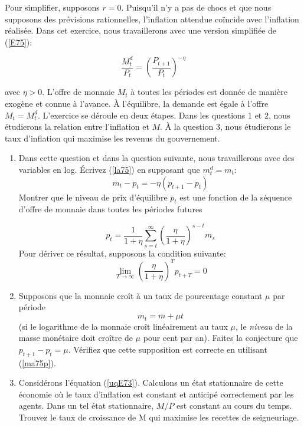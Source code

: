 \documentclass[a4paper,11pt]{article}
\begin{document}
Pour simplifier, supposons $ r=0 $. Puisqu'il n'y a pas de chocs et que nous supposons des prévisions rationnelles, l'inflation attendue coïncide avec l'inflation réalisée. Dans cet exercice, nous travaillerons avec une version simplifiée de (\ref{E75}):

\begin{equation}
\frac{M^d_{t}}{P_{t}}=(\frac{P_{t+1}}{P_{t}})^{-\eta}  \label{la75}
\end{equation}

avec $ \eta> 0 $. L'offre de monnaie $ M_t $ à toutes les périodes est donnée de manière exogène et connue à l'avance. \`{A} l'équilibre, la demande est égale à l'offre $ M_t = M^d_t $. L'exercice se déroule en deux étapes. Dans les questions 1 et 2, nous étudierons la relation entre l'inflation et $M$. À la question 3, nous étudierons le taux d'inflation qui maximise les revenus du gouvernement.


\begin{enumerate}
\item Dans cette question et dans la question suivante, nous travaillerons avec des variables en log. Écrivez (\ref{la75}) en supposant que $m^d_t=m_t$:  
\begin{equation}
m_t-p_t=-\eta(p_{t+1}-p_t)  \label{ma75p}
\end{equation}  Montrer que le niveau de prix d'équilibre $ p_t $ est une fonction de la séquence d'offre de monnaie  dans toutes les périodes futures

\begin{equation}
p_t=\frac{1}{1+\eta}\sum^{\infty}_{s=t}(\frac{\eta}{1+\eta})^{s-t} m_s\label{aa}
\end{equation}
Pour dériver ce résultat, supposons la condition suivante:
 \begin{equation}\label{bubble}\lim_{T\to \infty} (\frac{\eta}{1+\eta})^Tp_{t+T}=0
\end{equation}

\item Supposons que la monnaie croît à un taux de pourcentage constant $ \mu $ par période
\begin{equation}
m_t=\bar{m}+\mu t
\end{equation} 
(si le logarithme de la monnaie croît linéairement au taux $ \mu $, le \textit {niveau} de la masse monétaire doit croître de $\mu $ pour cent par an). Faites la conjecture que $ p_ {t + 1} -p_t = \mu $. Vérifiez que cette supposition est correcte en utilisant (\ref{ma75p}).
\bigskip 

\item Considérons l'équation (\ref{uqE73}). Calculons un \'{e}tat stationnaire de cette \' {e}conomie o\`{u} le taux
d'inflation est constant et anticip\'{e} correctement par les agents.
Dans un tel \'{e}tat stationnaire, $ M / P $ est constant au cours du temps. Trouvez le taux de croissance de M qui maximise les
recettes de seigneuriage.
\bigskip

\end{enumerate}
\end{document}
